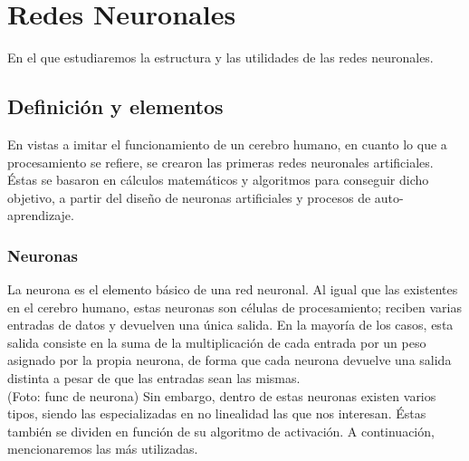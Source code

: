 \chapter{Redes Neuronales}
\label{cap:neuralnetworks}

En el que estudiaremos la estructura y las utilidades de las redes neuronales. 


\section{Definición y elementos}
En vistas a imitar el funcionamiento de un cerebro humano, en cuanto lo que a procesamiento se refiere, se crearon las primeras redes neuronales artificiales. Éstas se basaron en cálculos matemáticos y algoritmos para conseguir dicho objetivo, a partir del diseño de neuronas artificiales y procesos de auto-aprendizaje.

\subsection{Neuronas}
La neurona es el elemento básico de una red neuronal. Al igual que las existentes en el cerebro humano, estas neuronas son células de procesamiento; reciben varias entradas de datos y devuelven una única salida. En la mayoría de los casos, esta salida consiste en la suma de la multiplicación de cada entrada por un peso asignado por la propia neurona, de forma que cada neurona devuelve una salida distinta a pesar de que las entradas sean las mismas. \\
(Foto: func de neurona)
Sin embargo, dentro de estas neuronas existen varios tipos, siendo las especializadas en no linealidad las que nos interesan. Éstas también se dividen en función de su algoritmo de activación. A continuación, mencionaremos las más utilizadas.

